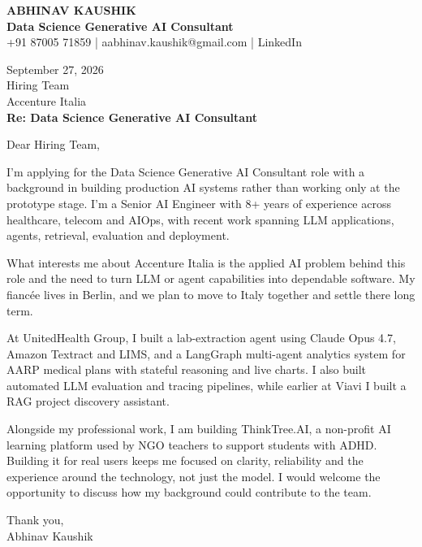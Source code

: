 \documentclass[10pt,a4paper]{article}
\begin{document}
\begin{center}
{\Large\bfseries ABHINAV KAUSHIK}\\[2pt]
{\bfseries Data Science Generative AI Consultant}\\[2pt]
+91 87005 71859 \quad | \quad aabhinav.kaushik@gmail.com \quad | \quad LinkedIn
\end{center}
\vspace{8pt}
September 27, 2026\\[6pt]
Hiring Team\\
Accenture Italia\\[4pt]
\textbf{Re: Data Science Generative AI Consultant}

Dear Hiring Team,

I’m applying for the Data Science Generative AI Consultant role with a background in building production AI systems rather than working only at the prototype stage. I’m a Senior AI Engineer with 8+ years of experience across healthcare, telecom and AIOps, with recent work spanning LLM applications, agents, retrieval, evaluation and deployment.

What interests me about Accenture Italia is the applied AI problem behind this role and the need to turn LLM or agent capabilities into dependable software. My fiancée lives in Berlin, and we plan to move to Italy together and settle there long term.

At UnitedHealth Group, I built a lab-extraction agent using Claude Opus 4.7, Amazon Textract and LIMS, and a LangGraph multi-agent analytics system for AARP medical plans with stateful reasoning and live charts. I also built automated LLM evaluation and tracing pipelines, while earlier at Viavi I built a RAG project discovery assistant.

Alongside my professional work, I am building ThinkTree.AI, a non-profit AI learning platform used by NGO teachers to support students with ADHD. Building it for real users keeps me focused on clarity, reliability and the experience around the technology, not just the model. I would welcome the opportunity to discuss how my background could contribute to the team.

Thank you,\\
Abhinav Kaushik
\end{document}
